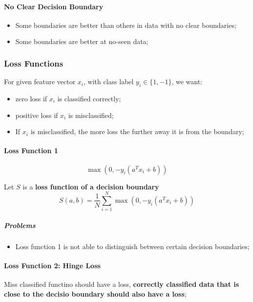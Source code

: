     \paragraph{No Clear Decision Boundary}
    \begin{itemize}
      \item Some boundaries are better than others in data with no clear boundaries;
      \item Some boundaries are better at no-seen data;
    \end{itemize}
    
    \subsubsection{Loss Functions}
      
      For given feature vector $ x_{i} $, with class label $ y_{i} \in \{ 1, -1 \} $, we want:
      \begin{itemize}
        \item zero loss if $ x_{i} $ is classified correctly;
        \item positive loss if $ x_{i} $ is misclassified;
        \item If $ x_{i} $ is misclassified, the more loss the further away it is from the boundary;
      \end{itemize}
      
      \paragraph{Loss Function 1}
      \begin{equation}
        \max\left( 0, -y_{i} \left( a^{T} x_{i} + b \right) \right)
      \end{equation}
      
      Let $ S $ is a \textbf{loss function of a decision boundary}
      \begin{equation}
        S\left( a, b \right) = \frac{1}{N} \sum_{i = 1}^{N} \max\left( 0, -y_{i} \left( a^{T} x_{i} + b \right) \right)
      \end{equation}
      
      \subparagraph{Problems}
      \begin{itemize}
        \item Loss function 1 is not able to distinguish between certain decision boundaries;
      \end{itemize}
      
      \paragraph{Loss Function 2: Hinge Loss}
      Miss classified functino should have a loss, \textbf{correctly classified data that is close to the decisio boundary should also have a loss};
      
